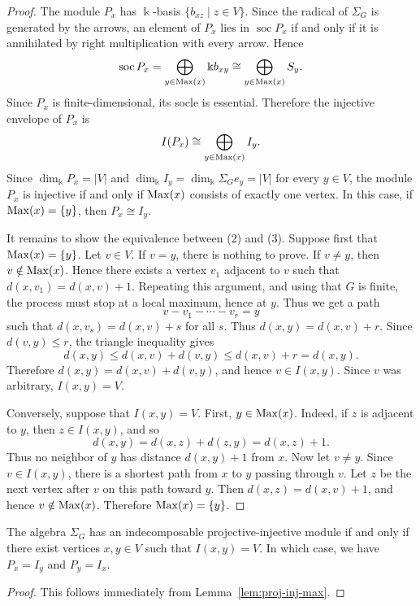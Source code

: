 \documentclass[a4paper,leqno]{amsart}
\begin{document}
\begin{proof}
The module $P_x$ has $\Bbbk$-basis $\{b_{xz}\mid z\in V\}$. Since the radical of $\Sigma_G$ is generated by the arrows, an element of $P_x$ lies in $\operatorname{soc}P_x$ if and only if it is annihilated by right multiplication with every arrow. Hence
\[
\operatorname{soc}P_x=
\bigoplus_{y\in \operatorname{Max}(x)}\Bbbk b_{xy}
\cong
\bigoplus_{y\in \operatorname{Max}(x)}S_y .
\]
Since $P_x$ is finite-dimensional, its socle is essential. Therefore the injective envelope of $P_x$ is
\[
I(P_x)\cong \bigoplus_{y\in \operatorname{Max}(x)} I_y .
\]
Since $\dim_{\Bbbk}P_x=|V|$ and
$\dim_{\Bbbk}I_y=\dim_{\Bbbk}\Sigma_Ge_y=|V|$ for every $y\in V$,
the module $P_x$ is injective if and only if $\operatorname{Max}(x)$ consists of exactly one vertex. In this case, if $\operatorname{Max}(x)=\{y\}$, then $P_x\cong I_y$.

It remains to show the equivalence between (2) and (3). Suppose first that
$\operatorname{Max}(x)=\{y\}$. Let $v\in V$. If $v=y$, there is nothing to prove. If $v\neq y$, then $v\notin \operatorname{Max}(x)$. Hence there exists a vertex $v_1$ adjacent to $v$ such that
$d(x,v_1)=d(x,v)+1$. Repeating this argument, and using that $G$ is finite, the process must stop at a local maximum, hence at $y$. Thus we get a path
\[
v-v_1-\cdots-v_r=y
\]
such that $d(x,v_s)=d(x,v)+s$ for all $s$. Thus
$d(x,y)=d(x,v)+r$. Since $d(v,y)\leq r$, the triangle inequality gives
\[
d(x,y)\leq d(x,v)+d(v,y)\leq d(x,v)+r=d(x,y).
\]
Therefore $d(x,y)=d(x,v)+d(v,y)$, and hence $v\in I(x,y)$. Since $v$ was arbitrary, $I(x,y)=V$.

Conversely, suppose that $I(x,y)=V$. First, $y\in \operatorname{Max}(x)$. Indeed, if
$z$ is adjacent to $y$, then $z\in I(x,y)$, and so
\[
d(x,y)=d(x,z)+d(z,y)=d(x,z)+1.
\]
Thus no neighbor of $y$ has distance $d(x,y)+1$ from $x$. Now let
$v\neq y$. Since $v\in I(x,y)$, there is a shortest path from $x$ to $y$ passing through $v$. Let $z$ be the next vertex after $v$ on this path toward $y$. Then $d(x,z)=d(x,v)+1$, and hence $v\notin \operatorname{Max}(x)$. Therefore $\operatorname{Max}(x)=\{y\}$.
\end{proof}

\begin{cor}\label{cor:proj-inj-exists}
The algebra $\Sigma_G$ has an indecomposable projective-injective module if and only if there exist vertices $x,y\in V$ such that $I(x,y)=V$. In which case, we have $P_x=I_y$ and $P_y=I_x$.
\end{cor}

\begin{proof}
This follows immediately from Lemma~\ref{lem:proj-inj-max}.
\end{proof}
\end{document}
